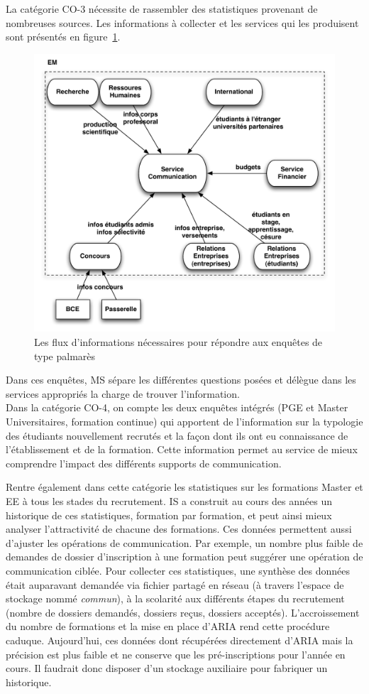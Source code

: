 \documentclass{book}
\begin{document}
La  catégorie  CO-3  nécessite  de  rassembler  des  statistiques  provenant  de
nombreuses  sources.  Les informations  à  collecter  et  les services  qui  les
produisent sont présentés en figure~\ref{fg:comm_flux}.
\begin{figure}[hbt]
\begin{center}
\includegraphics[width=.75\linewidth]{figs/comm_flux.pdf}
\end{center}
\caption{Les flux d'informations nécessaires pour répondre aux enquêtes de 
type palmarès}
\label{fg:comm_flux}
\end{figure}
Dans ces enquêtes, MS sépare les différentes questions posées et délègue
dans les services appropriés la charge de trouver l'information.\\


Dans la  catégorie CO-4,  on compte  les deux enquêtes  intégrés (PGE  et Master
Universitaires,  formation  continue)  qui  apportent de  l'information  sur  la
typologie  des étudiants  nouvellement  recrutés et  la façon  dont  ils ont  eu
connaissance de l'établissement et de  la formation. Cette information permet au
service de mieux comprendre l'impact des différents supports de communication.

Rentre également dans cette catégorie les statistiques sur les formations Master
et EE à  tous les stades du recrutement.  IS a construit au cours  des années un
historique de  ces statistiques,  formation par formation,  et peut  ainsi mieux
analyser l'attractivité de chacune des formations.  Ces données permettent aussi
d'ajuster les opérations  de communication.  Par exemple, un  nombre plus faible
de demandes de dossier d'inscription à une formation peut suggérer une opération
de  communication ciblée.   Pour collecter  ces statistiques,  une synthèse  des
données  était auparavant  demandée via  fichier  partagé en  réseau (à  travers
l'espace de  stockage nommé  \textit{commun}\index{\clecommun}), à  la scolarité
aux  différents étapes  du recrutement  (nombre de  dossiers demandés,  dossiers
reçus, dossiers acceptés).   L'accroissement du nombre de formations  et la mise
en  place d'ARIA  rend cette  procédure caduque.  Aujourd'hui, ces  données dont
récupérées directement d'ARIA mais la précision est plus faible et 
ne conserve  que les pré-inscriptions  pour l'année  en cours. Il  faudrait donc
disposer d'un stockage auxiliaire pour fabriquer un historique.
\end{document}
